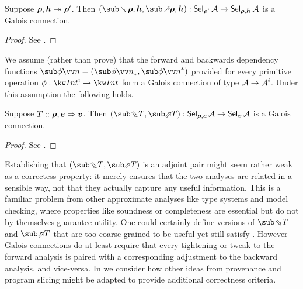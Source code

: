    \begin{theorem}
\label{thm:core-language:closeDefs:gc}
   Suppose $\bm{\rho}, \bm{h} \twoheadrightarrow \bm{\rho}'$. Then $({\closeDefsBwdF{\raw{\rho},\raw{h}}, \closeDefsFwdF{\raw{\rho},\raw{h}}}): \Sel{\raw{\rho}'}{A} \to \Sel{\raw{\rho},\raw{h}}{A}$ is a Galois connection.
\end{theorem}

\begin{proof}
   \ifappendices See . \else \ProofInSupplementaryMaterial \fi
   \end{proof}

We assume (rather than prove) that the forward and backwards dependency functions $\primGCBool{\phi}{\vec{n}} = (\primFwdBool{\phi}{\vec{n}}, \primBwdBool{\phi}{\vec{n}})$ provided for every primitive operation $\phi: \tyInt^i \to \tyInt$ form a Galois connection of type $\mathcal{A} \to \mathcal{A}^i$. Under this assumption the following holds.

\begin{theorem}
\label{thm:core-language:eval:gc}
   Suppose $T :: \bm{\rho}, \bm{e} \Rightarrow \bm{v}$.  Then $(\evalBwdF{T}, \evalFwdF{T}): \Sel{\raw{\rho}, \raw{e}}{A} \to \Sel{\raw{v}}{A}$ is a Galois connection.
\end{theorem}

\begin{proof}
   \ifappendices See . \else \ProofInSupplementaryMaterial \fi
\end{proof}

Establishing that $(\evalBwdF{T}, \evalFwdF{T})$ is an adjoint pair might seem rather weak as a correctess property: it merely ensures that the two analyses are related in a sensible way, not that they actually capture any useful information. This is a familiar problem from other approximate analyses like type systems and model checking, where properties like soundness or completeness are essential but do not by themselves guarantee utility. One could certainly define versions of $\evalBwdF{T}$ and $\evalFwdF{T}$ that are too coarse grained to be useful yet still satisfy . However Galois connections do at least require that every tightening or tweak to the forward analysis is paired with a corresponding adjustment to the backward analysis, and vice-versa. In  we consider how other ideas from provenance and program slicing might be adapted to provide additional correctness criteria.
